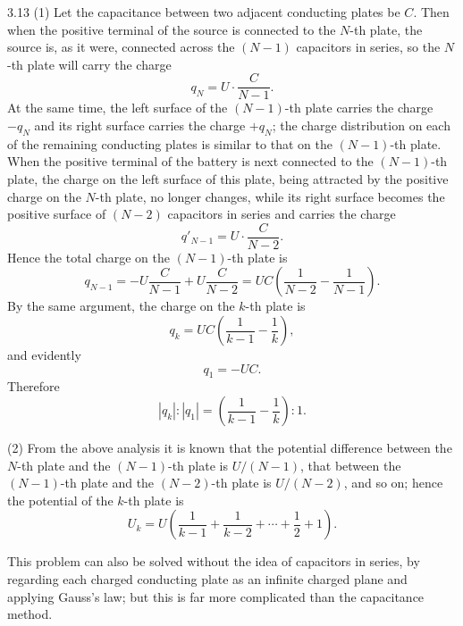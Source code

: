 \begin{solution}{3.13}
(1) Let the capacitance between two adjacent conducting plates be $C$. Then when the positive terminal of the source is connected to the $N$-th plate, the source is, as it were, connected across the $(N-1)$ capacitors in series, so the $N$-th plate will carry the charge
\[
q_N=U\cdot\frac{C}{N-1}.
\]
At the same time, the left surface of the $(N-1)$-th plate carries the charge $-q_N$ and its right surface carries the charge $+q_N$; the charge distribution on each of the remaining conducting plates is similar to that on the $(N-1)$-th plate. When the positive terminal of the battery is next connected to the $(N-1)$-th plate, the charge on the left surface of this plate, being attracted by the positive charge on the $N$-th plate, no longer changes, while its right surface becomes the positive surface of $(N-2)$ capacitors in series and carries the charge
\[
q'_{N-1}=U\cdot\frac{C}{N-2}.
\]
Hence the total charge on the $(N-1)$-th plate is
\[
q_{N-1}=-U\frac{C}{N-1}+U\frac{C}{N-2}
=UC\left(\frac{1}{N-2}-\frac{1}{N-1}\right).
\]
By the same argument, the charge on the $k$-th plate is
\[
q_k=UC\left(\frac{1}{k-1}-\frac{1}{k}\right),
\]
and evidently
\[
q_1=-UC.
\]
Therefore
\[
|q_k|:|q_1|=\left(\frac{1}{k-1}-\frac{1}{k}\right):1.
\]

(2) From the above analysis it is known that the potential difference between the $N$-th plate and the $(N-1)$-th plate is $U/(N-1)$, that between the $(N-1)$-th plate and the $(N-2)$-th plate is $U/(N-2)$, and so on; hence the potential of the $k$-th plate is
\[
U_k=U\left(\frac{1}{k-1}+\frac{1}{k-2}+\cdots+\frac{1}{2}+1\right).
\]

\begin{commentary}
This problem can also be solved without the idea of capacitors in series, by regarding each charged conducting plate as an infinite charged plane and applying Gauss's law; but this is far more complicated than the capacitance method.
\end{commentary}
\end{solution}

